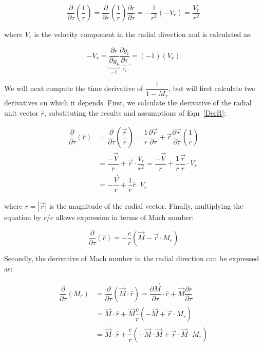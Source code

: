 \documentclass[]{aiaa-tc}%
\begin{document}
\begin{equation} \label{DerR}
\dfrac{\partial}{\partial\tau} \left( \dfrac{1}{r} \right)
= \dfrac{\partial}{\partial r} \left( \dfrac{1}{r} \right)
    \dfrac{\partial r}{\partial\tau}
= -\dfrac{1}{r^2} (-V_r)
= \dfrac{V_r}{r^2}
\end{equation}

\noindent where $V_r$ is the velocity component in the radial direction and is calculated as:

\begin{equation} \label{Vr}
-V_r = \underbrace{\dfrac{\partial r}{\partial y_i}}_{-1}
    \underbrace{\dfrac{\partial y_i}{\partial \tau}}_{V_r}
= (-1) (V_r)
\end{equation}

We will next compute the time derivative of $\dfrac{1}{1 - M_r}$, but will first calculate two derivatives on which it depends.  First, we calculate the derivative of the radial unit vector $\hat{r}$, substituting the results and assumptions of Eqn~\ref{DerR}:

\begin{align*}
\dfrac{\partial}{\partial\tau} \left( \hat{r} \right)
&= \dfrac{\partial}{\partial\tau} \left( \dfrac{\vec{r}}{r} \right)
    = \dfrac{1}{r} \dfrac{\partial \vec{r}}{\partial\tau}
    + \vec{r}\dfrac{\partial\vec{r}}{\partial\tau} \left(\dfrac{1}{r} \right)\\
&= \dfrac{-\vec{V}}{r} + \vec{r} \cdot \dfrac{V_r}{r^2}
    = \dfrac{-\vec{V}}{r} + \dfrac{1}{r} \dfrac{\vec{r}}{r} \cdot V_r \\
&= -\dfrac{\vec{V}}{r} + \dfrac{1}{r} \hat{r} \cdot V_r
\end{align*}

\noindent where $r = |\vec{r}|$ is the magnitude of the radial vector.  Finally, multiplying the equation by $c/c$ allows expression in terms of Mach number:

\begin{equation} \label{DerRhat}
\dfrac{\partial}{\partial\tau} \left( \hat{r} \right)
= -\dfrac{c}{r} \left( \vec{M} - \vec{r} \cdot M_r \right)
\end{equation}


Secondly, the derivative of Mach number in the radial direction can be expressed as:

\begin{align*}
\dfrac{\partial}{\partial\tau} \left( M_r \right)
&= \dfrac{\partial}{\partial\tau} \left( \vec{M} \cdot \hat{r} \right)
= \dfrac{\partial\vec{M}}{\partial\tau}
    \cdot\hat{r} + \vec{M} \dfrac{\partial\hat{r}}{\partial\tau} \\
&= \dot{\vec{M}}\cdot\hat{r} + \vec{M} \dfrac{c}{r}
    \left( -\vec{M} + \vec{r} \cdot M_r \right) \\
&= \dot{\vec{M}}\cdot\hat{r} + \dfrac{c}{r}
    \left( -\vec{M}\cdot\vec{M} + \vec{r} \cdot\vec{M}\cdot M_r \right)
\end{align*}
\end{document}
